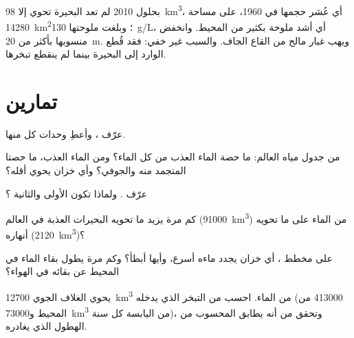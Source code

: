 بحلول 2010 لم تعد البحيرة تحوي إلا \qty{98}{km^3}، أي عُشر حجمها في 1960، على مساحة
\qty{14280}{km^2}؛ وبلغت ملوحتها \qty{130}{g/L}، أي أشد ملوحة بكثير من
المحيط. وانخفض منسوبها بأكثر من \qty{20}{m}. ويهب غبار مالح
من القاع الجاف. والسبب غير خفي: فقد قُطع الوارد إلى البحيرة
بينما لم ينقطع تبخرها.

\section{تمارين}

\begin{exercise}[$\star$]\label{exo:g10:freshwater-resources:1}
عرّف   ، وأعطِ وحدات كل منها.
\end{exercise}

\begin{exercise}[$\star$]\label{exo:g10:freshwater-resources:2}
من جدول مياه العالم: ما حصة الماء العذب من كل الماء؟ ومن الماء
العذب، ما حصتا المتجمد منه والجوفي؟ وأي خزان يحوي
أقله؟
\end{exercise}

\begin{exercise}[$\star$]\label{exo:g10:freshwater-resources:3}
عرّف  . ولماذا تكون الأولى 
والثانية ؟
\end{exercise}

\begin{exercise}[$\star$]\label{exo:g10:freshwater-resources:4}
كم مرة يزيد ما تحويه البحيرات العذبة في العالم (\num{91000}~\unit{km^3})
من الماء على ما تحويه أنهاره (\num{2120}~\unit{km^3})؟
\end{exercise}

\begin{exercise}[$\star$]\label{exo:g10:freshwater-resources:5}
على مخطط ، أي خزان يجدد ماءه أسرع، وأيها
أبطأ؟ وكم مرة يطول بقاء الماء في المحيط عن بقائه في
الهواء؟
\end{exercise}

\begin{exercise}[$\star\star$]\label{exo:g10:freshwater-resources:6}
يحوي الغلاف الجوي \num{12700}~\unit{km^3} من الماء. احسب 
من التبخر الذي يدخله (\num{413000} من المحيط
و\num{73000}~\unit{km^3} من اليابسة كل سنة)، وتحقق من أنه يطابق
 المحسوب من الهطول الذي يغادره.
\end{exercise}

